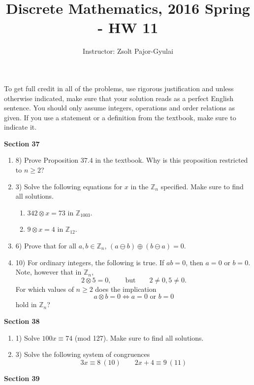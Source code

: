 \documentclass[11pt]{preprint}
\title{Discrete Mathematics, 2016 Spring - HW 11}
\author{Instructor: Zsolt Pajor-Gyulai}
\institute{Courant Institute of Mathematical Sciences, NYU}
\def\enumb{\begin{enumerate}}
\def\enume{\end{enumerate}}
\begin{document}
\maketitle

To get full credit  in all of the problems, use rigorous justification and unless otherwise indicated, make sure that your solution reads as a perfect English sentence. You should only assume integers, operations and order relations as given. If you use a statement or a definition from the textbook, make sure to indicate it.
\vspace{0.2cm}


\textbf{Section 37}
\enumb
\item[8)] Prove Proposition $37.4$ in the textbook. Why is this proposition restricted to $n\geq 2$?
\item[3)] Solve the following equations for $x$ in the $\mathbb{Z}_n$ specified. Make sure to find all solutions.
\enumb
\item $342\otimes x=73$ in $\mathbb{Z}_{1003}$.
\item $9\otimes x=4$ in $\mathbb{Z}_{12}$.
\enume
\item[6)] Prove that for all $a,b\in\mathbb{Z}_n$, $(a\ominus b)\oplus (b\ominus a)=0$.
\item[10)] For ordinary integers, the following is true. If $ab=0$, then $a=0$ or $b=0$. Note, however that in $\mathbb{Z}_n$,
\[
2\otimes 5=0,\qquad \textrm{but}\qquad 2\neq 0, 5\neq 0.
\]
For which values of $n\geq 2$ does the implication
\[
a\otimes b=0\Leftrightarrow a=0\textrm{ or }b=0
\]
hold in $\mathbb{Z}_n$?
\enume

\textbf{Section 38}

\enumb
\item[1)] Solve $100x\equiv 74$ (mod 127). Make sure to find all solutions.
\item[3)] Solve the following system of congruences
\[
3x\equiv 8~(10)\qquad 2x+4\equiv 9~(11)
\]

\enume
\newpage
\textbf{Section 39}
\end{document}
